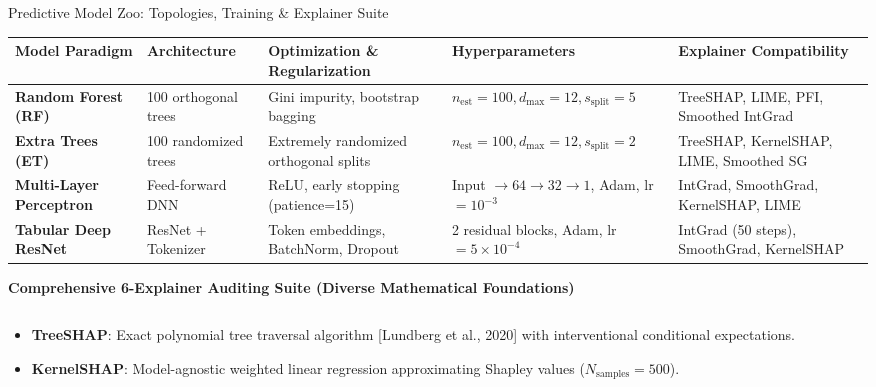 \documentclass[aspectratio=169,10pt]{beamer}
\begin{document}
\begin{frame}{Predictive Model Zoo: Topologies, Training \& Explainer Suite}
  \vspace{-0.15cm}
  \begin{table}[h]
    \centering
    \tiny
    \begin{tabularx}{\textwidth}{llXXl}
      \toprule
      \textbf{Model Paradigm} & \textbf{Architecture} & \textbf{Optimization \& Regularization} & \textbf{Hyperparameters} & \textbf{Explainer Compatibility} \\
      \midrule
      \textbf{Random Forest (RF)} & 100 orthogonal trees & Gini impurity, bootstrap bagging & $n_{\text{est}}=100, d_{\text{max}}=12, s_{\text{split}}=5$ & TreeSHAP, LIME, PFI, Smoothed IntGrad \\
      \textbf{Extra Trees (ET)} & 100 randomized trees & Extremely randomized orthogonal splits & $n_{\text{est}}=100, d_{\text{max}}=12, s_{\text{split}}=2$ & TreeSHAP, KernelSHAP, LIME, Smoothed SG \\
      \textbf{Multi-Layer Perceptron} & Feed-forward DNN & ReLU, early stopping (patience=15) & Input $\to 64 \to 32 \to 1$, Adam, lr$=10^{-3}$ & IntGrad, SmoothGrad, KernelSHAP, LIME \\
      \textbf{Tabular Deep ResNet} & ResNet + Tokenizer & Token embeddings, BatchNorm, Dropout & 2 residual blocks, Adam, lr$=5\times 10^{-4}$ & IntGrad (50 steps), SmoothGrad, KernelSHAP \\
      \bottomrule
    \end{tabularx}
  \end{table}
  \vspace{-0.15cm}
  \begin{block}{\textbf{Comprehensive 6-Explainer Auditing Suite (Diverse Mathematical Foundations)}}
    \tiny
    \begin{columns}[t]
      \begin{column}{0.49\textwidth}
        \begin{itemize}\setlength\itemsep{1pt}
          \item \textbf{TreeSHAP}: Exact polynomial tree traversal algorithm [Lundberg et al., 2020] with interventional conditional expectations.
          \item \textbf{KernelSHAP}: Model-agnostic weighted linear regression approximating Shapley values ($N_{\text{samples}} = 500$).

\end{itemize}
\end{column}
\end{columns}
\end{block}
\end{frame}
\end{document}
